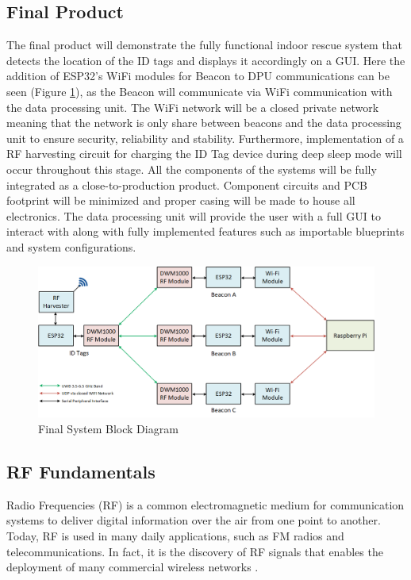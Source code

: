 \subsection{Final Product}
\medskip
The final product will demonstrate the fully functional indoor rescue system that detects the location of the ID tags and displays it accordingly on a GUI. Here the addition of ESP32’s WiFi modules for Beacon to DPU communications can be seen (Figure \ref{final}), as the Beacon will communicate via WiFi communication with the data processing unit. The WiFi network will be a closed private network meaning that the network is only share between beacons and the data processing unit to ensure security, reliability and stability. Furthermore, implementation of a RF harvesting circuit for charging the ID Tag device during deep sleep mode will occur throughout this stage. All the components of the systems will be fully integrated as a close-to-production product. Component circuits and \Gls{PCB} footprint will be minimized and proper casing will be made to house all electronics. The data processing unit will provide the user with a full GUI to interact with along with fully implemented features such as importable blueprints and system configurations.

\bigskip
\begin{figure}[H]
\centering
    \includegraphics[width=\linewidth]{./images/03_final.png}
    \caption{Final System Block Diagram}
    \label{final}
\end{figure}


\pagebreak
\subsection{RF Fundamentals}
\medskip
Radio Frequencies (\Gls{RF}) is a common electromagnetic medium for communication systems to deliver digital information over the air from one point to another. Today, RF is used in many daily applications, such as \Gls{FM} radios and telecommunications. In fact, it is the discovery of RF signals that enables the deployment of many commercial wireless networks \cite{R2-4-1}.

